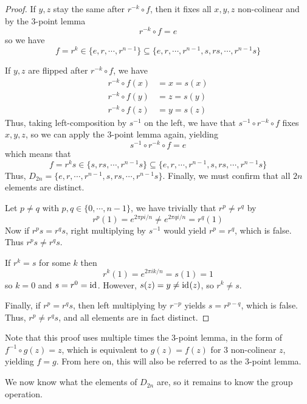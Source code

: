 \documentclass[12pt]{article}
\begin{document}
\begin{proof}
    If $y,z$ stay the same after $r^{-k}\circ f$,
    then it fixes all $x,y,z$ non-colinear and by the 3-point lemma
    \[
        r^{-k} \circ f = e
    \]
    so we have
    \[
        f = r^{k} \in \{e,r,\cdots,r^{n-1}\} \subseteq \{e,r,\cdots,r^{n-1},s,rs,\cdots,r^{n-1}s\}
    \]

    If $y,z$ are flipped after $r^{-k} \circ f$, we have
    \begin{align*}
        r^{-k}\circ f(x) &= x = s(x)\\
        r^{-k}\circ f(y) &= z = s(y)\\
        r^{-k}\circ f(z) &= y = s(z)
    \end{align*}
    Thus, taking left-composition by $s^{-1}$ on the left,
    we have that $s^{-1} \circ r^{-k} \circ f$ fixes $x,y,z$,
    so we can apply the 3-point lemma again, yielding
    \[
        s^{-1} \circ r^{-k} \circ f = e
    \]
    which means that
    \[
        f = r^{k}s \in \{s,rs,\cdots,r^{n-1}s\} \subseteq \{e,r,\cdots,r^{n-1},s,rs,\cdots,r^{n-1}s\} 
    \]
    Thus, $D_{2n} = \{e,r,\cdots,r^{n-1},s,rs,\cdots,r^{n-1}s\}$.
    Finally, we must confirm that all $2n$ elements are distinct.

    Let $p \ne q$ with $p,q \in \{0,\cdots,n-1\}$, 
    we have trivially that $r^{p} \ne r^{q}$ by
    \[
    r^{p}(1) = e^{2\pi pi/n} \ne e^{2 \pi qi/n} = r^{q}(1)
    \]
    Now if $r^{p}s = r^{q}s$, right multiplying by $s^{-1}$ would
    yield $r^{p} = r^{q}$, which is false. Thus $r^{p}s \ne r^{q}s$.

    If $r^{k} = s$ for some $k$ then
    \[
        r^{k}(1) = e^{2\pi ik/n} = s(1) = 1
    \]
    so $k = 0$ and $s = r^{0} = \operatorname{id}_{}$.
    However, $s(z) = y \ne \operatorname{id}_{}(z)$, so $r^{k} \ne s$.

    Finally, if $r^{p} = r^{q}s$, then
    left multiplying by $r^{-p}$ yields $s = r^{p-q}$, which is false.
    Thus, $r^{p} \ne r^{q}s$, and all elements are in fact distinct.
\end{proof}

Note that this proof uses multiple times
the 3-point lemma, in the form of $f^{-1} \circ g (z) = z$,
which is equivalent to $g(z) = f(z)$
for 3 non-colinear $z$, yielding $f = g$.
From here on, this will also be referred to as the 3-point lemma.

We now know what the elements of $D_{2n}$ are,
so it remains to know the group operation.
\end{document}
